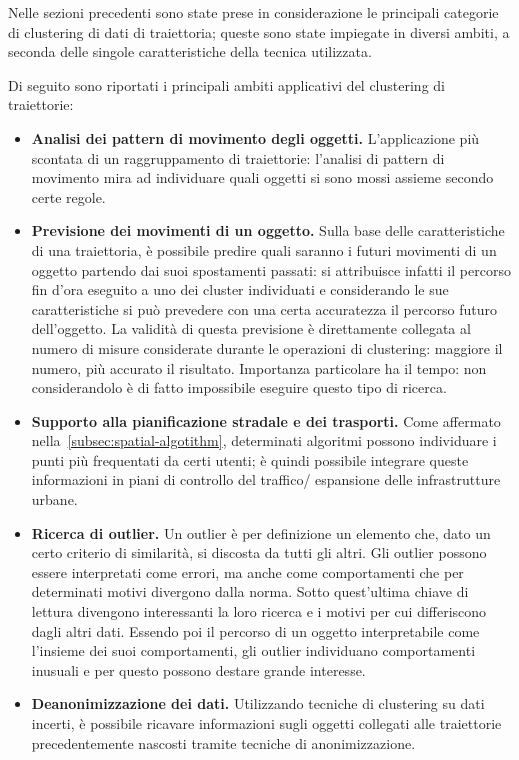 Nelle sezioni precedenti sono state prese in considerazione le principali categorie di clustering di dati di traiettoria; queste sono state impiegate in
diversi ambiti, a seconda delle singole caratteristiche della tecnica utilizzata.

Di seguito sono riportati i principali ambiti applicativi del clustering di traiettorie:

\begin{itemize}

  \item \textbf{Analisi dei pattern di movimento degli oggetti.}
  L'applicazione più scontata di un raggruppamento di traiettorie: l'analisi di pattern di
  movimento mira ad individuare quali oggetti si sono mossi assieme secondo certe regole.

  \item \textbf{Previsione dei movimenti di un oggetto.}
  Sulla base delle caratteristiche di una traiettoria, è possibile predire quali saranno
  i futuri movimenti di un oggetto partendo dai suoi spostamenti passati: si attribuisce infatti
  il percorso fin d'ora eseguito a uno dei cluster individuati e considerando le sue caratteristiche
  si può prevedere con una certa accuratezza il percorso futuro dell'oggetto.
  La validità di questa previsione è direttamente collegata al numero di misure considerate durante
  le operazioni di clustering: maggiore il numero, più accurato il risultato.
  Importanza particolare ha il tempo: non considerandolo è di fatto impossibile eseguire questo tipo
  di ricerca.

  \item \textbf{Supporto alla pianificazione stradale e dei trasporti.}
  Come affermato nella~\cref{subsec:spatial-algotithm}, determinati algoritmi
  possono individuare i punti più frequentati da certi utenti; è quindi possibile integrare queste
  informazioni in piani di controllo del traffico/ espansione delle infrastrutture urbane.

  \item \textbf{Ricerca di outlier.}
  Un outlier è per definizione un elemento che, dato un certo criterio di similarità,
  si discosta da tutti gli altri. 
  Gli outlier possono essere interpretati come errori, ma anche
  come comportamenti che per determinati motivi divergono dalla norma.
  Sotto quest'ultima chiave di lettura divengono interessanti la loro ricerca e i motivi per cui
  differiscono dagli altri dati.
  Essendo poi il percorso di un oggetto interpretabile come l'insieme dei suoi comportamenti,
  gli outlier individuano comportamenti inusuali e per questo possono destare grande interesse.

  \item \textbf{Deanonimizzazione dei dati.}
  Utilizzando tecniche di clustering su dati incerti, è possibile ricavare informazioni sugli
  oggetti collegati alle traiettorie precedentemente nascosti tramite tecniche di anonimizzazione.

\end{itemize}

